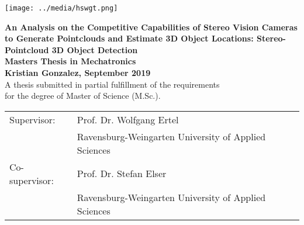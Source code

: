 \pagestyle{empty}
\begin{flushright}
\texttt{[image: ../media/hswgt.png]}
\end{flushright}

\begin{center}
\vspace*{2cm}

\LARGE
\textbf{An Analysis on the Competitive Capabilities of Stereo Vision Cameras to Generate Pointclouds and Estimate 3D Object Locations: Stereo-Pointcloud 3D Object Detection}\\
\Large
\vspace*{2cm}
\noindent \textbf{Masters Thesis in Mechatronics}\\
\vspace*{0.5cm}
\noindent \textbf{Kristian Gonzalez, September 2019}\\
\vspace*{2cm}
\normalsize
A thesis submitted in partial fulfillment of the requirements\\ for the degree
of Master of Science (M.Sc.).

\end{center}

\vspace*{4.5cm}
\begin{tabular}{ll}
Supervisor: & Prof. Dr. Wolfgang Ertel \\
 & Ravensburg-Weingarten University of Applied Sciences\\
Co-supervisor: & Prof. Dr. Stefan Elser\\
 & Ravensburg-Weingarten University of Applied Sciences\\
\end{tabular}
